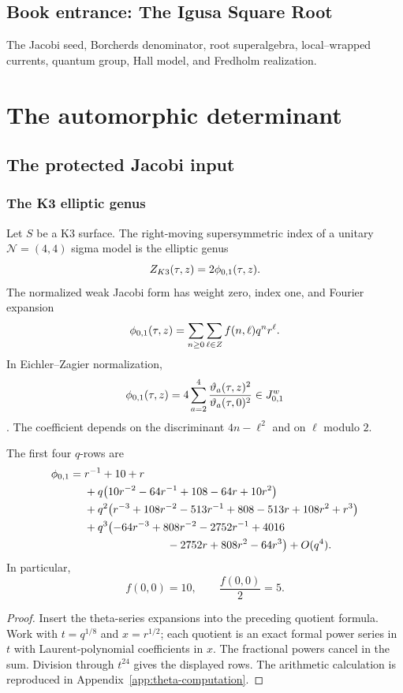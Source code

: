 \cleardoublepage
{}
{}
\chapter*{Book entrance: The Igusa Square Root}
\begin{summarybox}
The Jacobi seed, Borcherds denominator, root superalgebra, local--wrapped currents, quantum group, Hall model, and Fredholm realization.
\end{summarybox}
\part{The automorphic determinant}

\chapter{The protected Jacobi input}
\section{The K3 elliptic genus}
Let $S$ be a K3 surface. The right-moving supersymmetric index of a unitary $\mathcal N=(4,4)$ sigma model is the elliptic genus
\[
 Z_{K3}(\tau,z)=2{\phi_{0,1}}(\tau,z).
\]
The normalized weak Jacobi form has weight zero, index one, and Fourier expansion
\[
 {\phi_{0,1}}(\tau,z)=\sum_{n\ge0}\sum_{\ell\in Z}f(n,\ell)q^nr^\ell.
\]
In Eichler--Zagier normalization,
\[
 {\phi_{0,1}}(\tau,z)=4\sum_{a=2}^{4}
 \frac{\vartheta_a(\tau,z)^2}{\vartheta_a(\tau,0)^2}
 \in J^{w}_{0,1}
\]
\cite{EZ}. The coefficient depends on the discriminant $4n-\ell^2$ and on $\ell$ modulo $2$.

\begin{theorem}
The first four $q$-rows are
\[
\begin{aligned}
{\phi_{0,1}}={}&r^{-1}+10+r\\
&+q\bigl(10r^{-2}-64r^{-1}+108-64r+10r^2\bigr)\\
&+q^2\bigl(r^{-3}+108r^{-2}-513r^{-1}+808-513r+108r^2+r^3\bigr)\\
&+q^3\bigl(-64r^{-3}+808r^{-2}-2752r^{-1}+4016\\
&\hspace{7.5em}{}-2752r+808r^2-64r^3\bigr)+O(q^4).
\end{aligned}
\]
In particular,
\[
 f(0,0)=10,
 \qquad \frac{f(0,0)}2=5.
\]
\end{theorem}
\begin{proof}
Insert the theta-series expansions into the preceding quotient formula. Work with $t=q^{1/8}$ and $x=r^{1/2}$; each quotient is an exact formal power series in $t$ with Laurent-polynomial coefficients in $x$. The fractional powers cancel in the sum. Division through $t^{24}$ gives the displayed rows. The arithmetic calculation is reproduced in Appendix~\ref{app:theta-computation}.
\end{proof}

